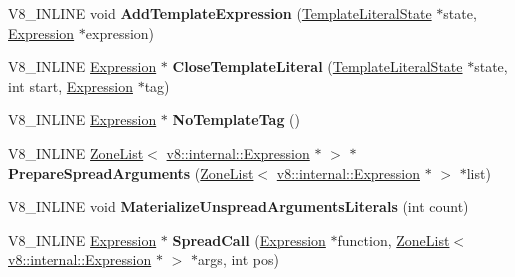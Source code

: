 \begin{DoxyCompactItemize}
\item 
V8\+\_\+\+I\+N\+L\+I\+NE void {\bfseries Add\+Template\+Expression} (\hyperlink{classv8_1_1internal_1_1_parser_traits_1_1_template_literal}{Template\+Literal\+State} $\ast$state, \hyperlink{classv8_1_1internal_1_1_expression}{Expression} $\ast$expression)\hypertarget{classv8_1_1internal_1_1_parser_traits_a8492116f60b1aaa8038c157e450ebc98}{}\label{classv8_1_1internal_1_1_parser_traits_a8492116f60b1aaa8038c157e450ebc98}

\item 
V8\+\_\+\+I\+N\+L\+I\+NE \hyperlink{classv8_1_1internal_1_1_expression}{Expression} $\ast$ {\bfseries Close\+Template\+Literal} (\hyperlink{classv8_1_1internal_1_1_parser_traits_1_1_template_literal}{Template\+Literal\+State} $\ast$state, int start, \hyperlink{classv8_1_1internal_1_1_expression}{Expression} $\ast$tag)\hypertarget{classv8_1_1internal_1_1_parser_traits_a8e3276ca768d1ae874f28acc53846f73}{}\label{classv8_1_1internal_1_1_parser_traits_a8e3276ca768d1ae874f28acc53846f73}

\item 
V8\+\_\+\+I\+N\+L\+I\+NE \hyperlink{classv8_1_1internal_1_1_expression}{Expression} $\ast$ {\bfseries No\+Template\+Tag} ()\hypertarget{classv8_1_1internal_1_1_parser_traits_aeb521e8eca215273215176ef12f50d19}{}\label{classv8_1_1internal_1_1_parser_traits_aeb521e8eca215273215176ef12f50d19}

\item 
V8\+\_\+\+I\+N\+L\+I\+NE \hyperlink{classv8_1_1internal_1_1_zone_list}{Zone\+List}$<$ \hyperlink{classv8_1_1internal_1_1_expression}{v8\+::internal\+::\+Expression} $\ast$ $>$ $\ast$ {\bfseries Prepare\+Spread\+Arguments} (\hyperlink{classv8_1_1internal_1_1_zone_list}{Zone\+List}$<$ \hyperlink{classv8_1_1internal_1_1_expression}{v8\+::internal\+::\+Expression} $\ast$ $>$ $\ast$list)\hypertarget{classv8_1_1internal_1_1_parser_traits_af1e362246d5fa6ad02eeefb433e77a34}{}\label{classv8_1_1internal_1_1_parser_traits_af1e362246d5fa6ad02eeefb433e77a34}

\item 
V8\+\_\+\+I\+N\+L\+I\+NE void {\bfseries Materialize\+Unspread\+Arguments\+Literals} (int count)\hypertarget{classv8_1_1internal_1_1_parser_traits_af9d24e8001903c173b4e9158103f80e7}{}\label{classv8_1_1internal_1_1_parser_traits_af9d24e8001903c173b4e9158103f80e7}

\item 
V8\+\_\+\+I\+N\+L\+I\+NE \hyperlink{classv8_1_1internal_1_1_expression}{Expression} $\ast$ {\bfseries Spread\+Call} (\hyperlink{classv8_1_1internal_1_1_expression}{Expression} $\ast$function, \hyperlink{classv8_1_1internal_1_1_zone_list}{Zone\+List}$<$ \hyperlink{classv8_1_1internal_1_1_expression}{v8\+::internal\+::\+Expression} $\ast$ $>$ $\ast$args, int pos)\hypertarget{classv8_1_1internal_1_1_parser_traits_a28d537fd20813d23c349422cf7702ad3}{}\label{classv8_1_1internal_1_1_parser_traits_a28d537fd20813d23c349422cf7702ad3}


\end{DoxyCompactItemize}
